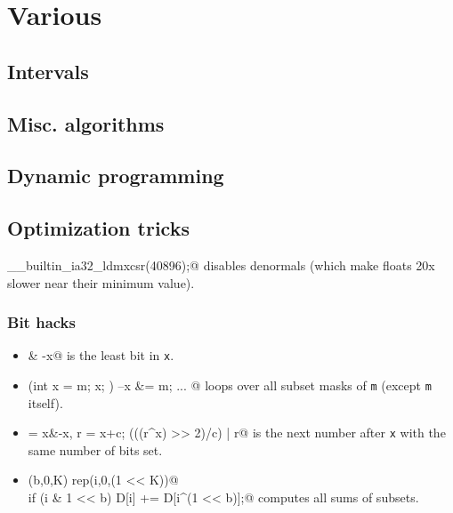 \chapter{Various}

\section{Intervals}

\section{Misc. algorithms}

\section{Dynamic programming}

\section{Optimization tricks}
	\verb@__builtin_ia32_ldmxcsr(40896);@ disables denormals (which make floats 20x slower near their minimum value).
	\subsection{Bit hacks}
		\begin{itemize}
			\item \verb@x & -x@ is the least bit in \texttt{x}.
			\item \verb@for (int x = m; x; ) { --x &= m; ... }@ loops over all subset masks of \texttt{m} (except \texttt{m} itself).
			\item \verb@c = x&-x, r = x+c; (((r^x) >> 2)/c) | r@ is the next number after \texttt{x} with the same number of bits set.
			\item \verb@rep(b,0,K) rep(i,0,(1 << K))@ \\ \verb@  if (i & 1 << b) D[i] += D[i^(1 << b)];@ computes all sums of subsets.
		\end{itemize}
